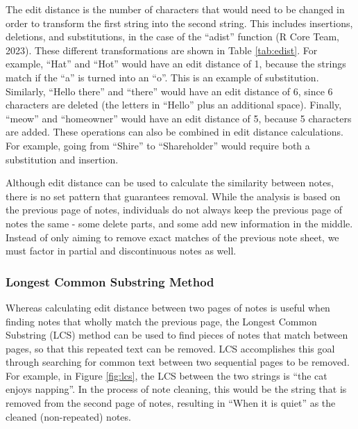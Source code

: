 \documentclass[print]{nuthesis}
\begin{document}
The edit distance is the number of characters that would need to be changed in order to transform the first string into the second string.
This includes insertions, deletions, and substitutions, in the case of the ``adist'' function (R Core Team, 2023).
These different transformations are shown in Table \ref{tab:edist}.
For example, ``Hat'' and ``Hot'' would have an edit distance of 1, because the strings match if the ``a'' is turned into an ``o''.
This is an example of substitution.
Similarly, ``Hello there'' and ``there'' would have an edit distance of 6, since 6 characters are deleted (the letters in ``Hello'' plus an additional space).
Finally, ``meow'' and ``homeowner'' would have an edit distance of 5, because 5 characters are added.
These operations can also be combined in edit distance calculations.
For example, going from ``Shire'' to ``Shareholder'' would require both a substitution and insertion.

Although edit distance can be used to calculate the similarity between notes, there is no set pattern that guarantees removal.
While the analysis is based on the previous page of notes, individuals do not always keep the previous page of notes the same - some delete parts, and some add new information in the middle.
Instead of only aiming to remove exact matches of the previous note sheet, we must factor in partial and discontinuous notes as well.

\hypertarget{longest-common-substring-method}{%
\subsubsection{Longest Common Substring Method}\label{longest-common-substring-method}}

Whereas calculating edit distance between two pages of notes is useful when finding notes that wholly match the previous page, the Longest Common Substring (LCS) method can be used to find pieces of notes that match between pages, so that this repeated text can be removed.
LCS accomplishes this goal through searching for common text between two sequential pages to be removed.
For example, in Figure \ref{fig:lcs}, the LCS between the two strings is ``the cat enjoys napping''.
In the process of note cleaning, this would be the string that is removed from the second page of notes, resulting in ``When it is quiet'' as the cleaned (non-repeated) notes.
\end{document}
